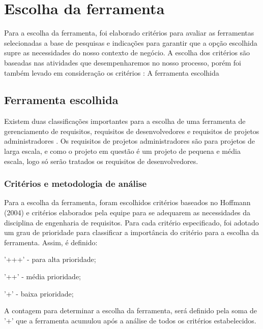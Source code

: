\section{Escolha da ferramenta}
    
Para a escolha da ferramenta, foi elaborado critérios para avaliar as ferramentas selecionadas a base de pesquisas e indicações para garantir que a opção escolhida supre as necessidades do nosso contexto de negócio. A escolha dos critérios são baseadas nas atividades que desempenharemos no nosso processo, porém foi também levado em consideração os critérios \cite{hoffmann2004}:
A ferramenta escolhida

\subsection{Ferramenta escolhida}

Existem duas classificações importantes para a escolha de uma ferramenta de gerenciamento de requisitos, requisitos de desenvolvedores e requisitos de projetos administradores \cite{hoffmann2004}. Os requisitos de projetos administradores são para projetos de larga escala, e como o projeto em questão é um projeto de pequena e média escala, logo só serão tratados os requisitos de desenvolvedores.

\subsubsection{Critérios e metodologia de análise}

Para a escolha da ferramenta, foram escolhidos critérios baseados no Hoffmann (2004) e critérios elaborados pela equipe para se adequarem as necessidades da disciplina de engenharia de requisitos.
Para cada critério especificado, foi adotado um grau de prioridade para classificar a importância do critério para a escolha da ferramenta. Assim, é definido: 
\begin{description}
    \item '+++' - para alta prioridade; 
    \item '++' - média prioridade; 
    \item '+' - baixa prioridade;
\end{description}

A contagem para determinar a escolha da ferramenta, será definido pela soma de '+' que a ferramenta acumulou após a análise de todos os critérios estabelecidos.

